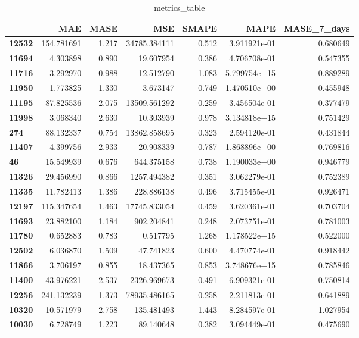 \begin{table}[h]
\centering
\caption{metrics_table}
\label{table:Dataset 2. Experiment with tuned values}
\begin{tabular}{lrrrrrr}
\toprule
{} &         MAE &   MASE &           MSE &  SMAPE &          MAPE &  MASE\_7\_days \\
\midrule
\textbf{12532} &  154.781691 &  1.217 &  34785.384111 &  0.512 &  3.911921e-01 &     0.680649 \\
\textbf{11694} &    4.303898 &  0.890 &     19.607954 &  0.386 &  4.706708e-01 &     0.547355 \\
\textbf{11716} &    3.292970 &  0.988 &     12.512790 &  1.083 &  5.799754e+15 &     0.889289 \\
\textbf{11950} &    1.773825 &  1.330 &      3.673147 &  0.749 &  1.470510e+00 &     0.455948 \\
\textbf{11195} &   87.825536 &  2.075 &  13509.561292 &  0.259 &  3.456504e-01 &     0.377479 \\
\textbf{11998} &    3.068340 &  2.630 &     10.303939 &  0.978 &  3.134818e+15 &     0.751429 \\
\textbf{274  } &   88.132337 &  0.754 &  13862.858695 &  0.323 &  2.594120e-01 &     0.431844 \\
\textbf{11407} &    4.399756 &  2.933 &     20.908339 &  0.787 &  1.868896e+00 &     0.769816 \\
\textbf{46   } &   15.549939 &  0.676 &    644.375158 &  0.738 &  1.190033e+00 &     0.946779 \\
\textbf{11326} &   29.456990 &  0.866 &   1257.494382 &  0.351 &  3.062279e-01 &     0.752389 \\
\textbf{11335} &   11.782413 &  1.386 &    228.886138 &  0.496 &  3.715455e-01 &     0.926471 \\
\textbf{12197} &  115.347654 &  1.463 &  17745.833054 &  0.459 &  3.620361e-01 &     0.703704 \\
\textbf{11693} &   23.882100 &  1.184 &    902.204841 &  0.248 &  2.073751e-01 &     0.781003 \\
\textbf{11780} &    0.652883 &  0.783 &      0.517795 &  1.268 &  1.178522e+15 &     0.522000 \\
\textbf{12502} &    6.036870 &  1.509 &     47.741823 &  0.600 &  4.470774e-01 &     0.918442 \\
\textbf{11866} &    3.706197 &  0.855 &     18.437365 &  0.853 &  3.748676e+15 &     0.785846 \\
\textbf{11400} &   43.976221 &  2.537 &   2326.969673 &  0.491 &  6.909321e-01 &     0.750814 \\
\textbf{12256} &  241.132239 &  1.373 &  78935.486165 &  0.258 &  2.211813e-01 &     0.641889 \\
\textbf{10320} &   10.571979 &  2.758 &    135.481493 &  1.443 &  8.284597e-01 &     1.027954 \\
\textbf{10030} &    6.728749 &  1.223 &     89.140648 &  0.382 &  3.094449e-01 &     0.475690 \\
\bottomrule
\end{tabular}
\end{table}
